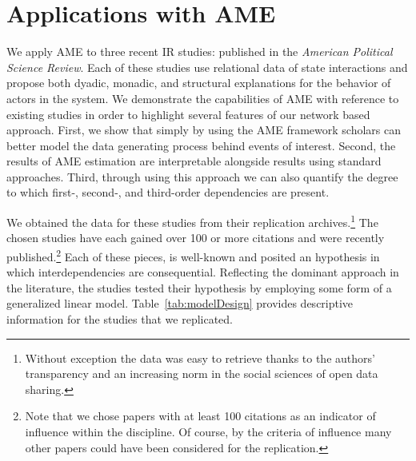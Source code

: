 \section{\textbf{Applications with AME}}

We apply AME to three recent IR studies: \citet{reiter:stam:2003, weeks:2012, gibler:2017} published in the \textit{American Political Science Review}. Each of these studies use relational data of state interactions and propose both dyadic, monadic, and structural explanations for the behavior of actors in the system. We demonstrate the capabilities of AME with reference to existing studies in order to highlight several features of our network based approach. First, we show that simply by using the AME framework scholars can better model the data generating process behind events of interest. Second, the results of AME estimation are interpretable alongside results using standard approaches. Third, through using this approach we can also quantify the degree to which first-, second-, and third-order dependencies are present.

We obtained the data for these studies from their replication archives.\footnote{Without exception the data was easy to retrieve thanks to the authors' transparency and an increasing norm in the social sciences of open data sharing.} The chosen studies have each gained over 100 or more citations and were recently published.\footnote{Note that we chose papers with at least 100 citations as an indicator of influence within the discipline. Of course, by the criteria of influence many other papers could have been considered for the replication.} Each of these pieces, is well-known and posited an hypothesis in which interdependencies are consequential. Reflecting the dominant approach in the literature, the studies tested their hypothesis by employing some form of a generalized linear model. Table~\ref{tab:modelDesign} provides descriptive information for the studies that we replicated.

